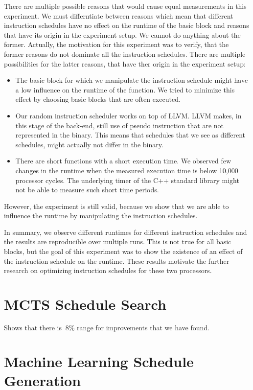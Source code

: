 There are multiple possible reasons that would cause equal measurements in this experiment.
We must differntiate between reasons which mean that different instruction schedules have no effect on the runtime of the basic block and reasons that have its origin in the experiment setup.
We cannot do anything about the former.
Actually, the motivation for this experiment was to verify, that the former reasons do not dominate all the instruction schedules.
There are multiple possibilities for the latter reasons, that have ther origin in the experiment setup:
\begin{itemize}
    \item The basic block for which we manipulate the instruction schedule might have a low influence on the runtime of the function.
        We tried to minimize this effect by choosing basic blocks that are often executed.
    \item Our random instruction scheduler works on top of LLVM.
        LLVM makes, in this stage of the back-end, still use of pseudo instruction that are not represented in the binary.
        This means that schedules that we see as different schedules, might actually not differ in the binary.
    \item There are short functions with a short execution time.
        We observed few changes in the runtime when the measured execution time is below 10,000 processor cycles.
        The underlying timer of the C++ standard library might not be able to measure such short time periods.  
\end{itemize}
However, the experiment is still valid, because we show that we are able to influence the runtime by manipulating the instruction schedules.

In summary, we observe different runtimes for different instruction schedules and the results are reproducible over multiple runs.
This is not true for all basic blocks, but the goal of this experiment was to show the existence of an effect of the instruction schedule on the runtime.
These results motivate the further research on optimizing instruction schedules for these two processors.

\section{MCTS Schedule Search}
Shows that there is $~8\%$ range for improvements that we have found.

\section{Machine Learning Schedule Generation}
